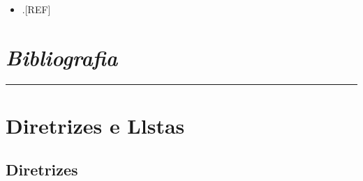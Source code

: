 \documentclass[
  a4paper,
]{book}
\providecommand{\tightlist}{%
  \setlength{\itemsep}{0pt}\setlength{\parskip}{0pt}}
\begin{document}
\begin{itemize}
\tightlist
\item
  .{[}REF{]}
\end{itemize}


\hypertarget{bibliografia}{%
\chapter*{\texorpdfstring{\emph{Bibliografia}}{Bibliografia}}\label{bibliografia}}

\markboth{}{}
\par\noindent\rule{\textwidth}{0.05in}

\hypertarget{diretrizes-e-llstas}{%
\chapter*{\texorpdfstring{\textbf{Diretrizes e Llstas}}{Diretrizes e Llstas}}\label{diretrizes-e-llstas}}

\hypertarget{diretrizes}{%
\section*{Diretrizes}\label{diretrizes}}
\end{document}
